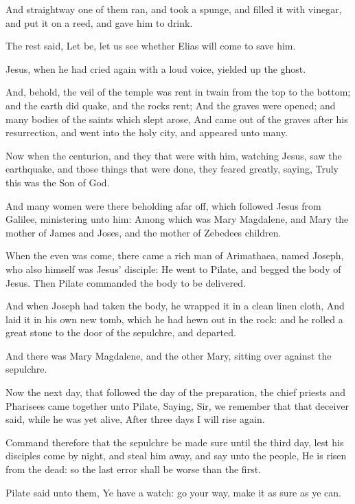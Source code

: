 \Verse And straightway one of them ran, and took a spunge, and filled it with vinegar, and put it on a reed, and gave him to drink.

\Verse The rest said, Let be, let us see whether Elias will come to save him.

\Verse Jesus, when he had cried again with a loud voice, yielded up the ghost.

\Verse And, behold, the veil of the temple was rent in twain from the top to the bottom; and the earth did quake, and the rocks rent; \Verse And the graves were opened; and many bodies of the saints which slept arose, \Verse And came out of the graves after his resurrection, and went into the holy city, and appeared unto many.

\Verse Now when the centurion, and they that were with him, watching Jesus, saw the earthquake, and those things that were done, they feared greatly, saying, Truly this was the Son of God.

\Verse And many women were there beholding afar off, which followed Jesus from Galilee, ministering unto him: \Verse Among which was Mary Magdalene, and Mary the mother of James and Joses, and the mother of Zebedees children.

\Verse When the even was come, there came a rich man of Arimathaea, named Joseph, who also himself was Jesus' disciple: \Verse He went to Pilate, and begged the body of Jesus. Then Pilate commanded the body to be delivered.

\Verse And when Joseph had taken the body, he wrapped it in a clean linen cloth, \Verse And laid it in his own new tomb, which he had hewn out in the rock: and he rolled a great stone to the door of the sepulchre, and departed.

\Verse And there was Mary Magdalene, and the other Mary, sitting over against the sepulchre.

\Verse Now the next day, that followed the day of the preparation, the chief priests and Pharisees came together unto Pilate, \Verse Saying, Sir, we remember that that deceiver said, while he was yet alive, After three days I will rise again.

\Verse Command therefore that the sepulchre be made sure until the third day, lest his disciples come by night, and steal him away, and say unto the people, He is risen from the dead: so the last error shall be worse than the first.

\Verse Pilate said unto them, Ye have a watch: go your way, make it as sure as ye can.

